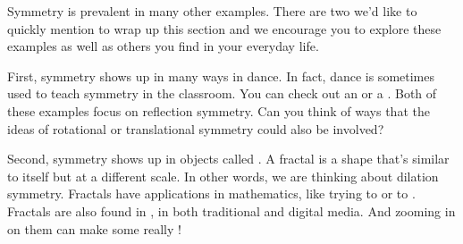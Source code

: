 \documentclass{ximera}
\begin{document}
Symmetry is prevalent in many other examples. There are two we'd like to quickly mention to wrap up this section and we encourage you to explore these examples as well as others you find in your everyday life. 

First, symmetry shows up in many ways in dance. In fact, dance is sometimes used to teach symmetry in the classroom. You can check out an  or a . Both of these examples focus on reflection symmetry. Can you think of ways that the ideas of rotational or translational symmetry could also be involved?

Second, symmetry shows up in objects called . A fractal is a shape that's similar to itself but at a different scale. In other words, we are thinking about dilation symmetry. Fractals have applications in mathematics, like trying to  or to . Fractals are also found in , in both traditional and digital media. And zooming in on them can make some really !
\end{document}
